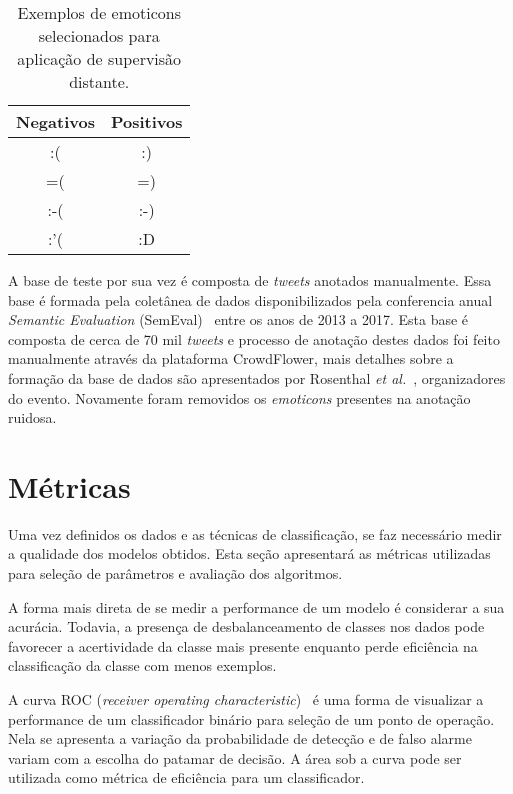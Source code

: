 \begin{table}[h]
    \begin{center}
        \begin{tabular}{| c | c |}
        \hline
        \textbf{Negativos} & \textbf{Positivos} \\ \hline
        :( & :) \\ \hline
        =( & =) \\ \hline
        :-( & :-) \\ \hline
        :'( & :D \\ \hline
        \end{tabular}
        \caption{Exemplos de emoticons selecionados para aplicação de supervisão distante.}
        \label{tab:emoticons}
    \end{center}
\end{table}

A base de teste por sua vez é composta de \textit{tweets} anotados manualmente.
Essa base é formada pela coletânea de dados disponibilizados pela conferencia anual \textit{Semantic Evaluation}
(SemEval)~\cite{semeval17} entre os anos de 2013 a 2017.
Esta base é composta de cerca de 70 mil \textit{tweets} e processo de anotação destes dados foi feito manualmente
através da plataforma CrowdFlower, mais detalhes sobre a formação da base de dados são apresentados por Rosenthal
\textit{et al.}~\cite{rosenthal17}, organizadores do evento.
Novamente foram removidos os \textit{emoticons} presentes na anotação ruidosa.

\section{Métricas} \label{sec:metrics}

Uma vez definidos os dados e as técnicas de classificação, se faz necessário medir a qualidade dos modelos obtidos.
Esta seção apresentará as métricas utilizadas para seleção de parâmetros e avaliação dos algoritmos.

A forma mais direta de se medir a performance de um modelo é considerar a sua acurácia.
Todavia, a presença de desbalanceamento de classes nos dados pode favorecer a acertividade da classe mais presente
enquanto perde eficiência na classificação da classe com menos exemplos.

A curva ROC (\textit{receiver operating characteristic})~\cite{bradley97} é uma forma de visualizar a performance de um
classificador binário para seleção de um ponto de operação.
Nela se apresenta a variação da probabilidade de detecção e de falso alarme variam com a escolha do patamar de decisão.
A área sob a curva pode ser utilizada como métrica de eficiência para um classificador.

